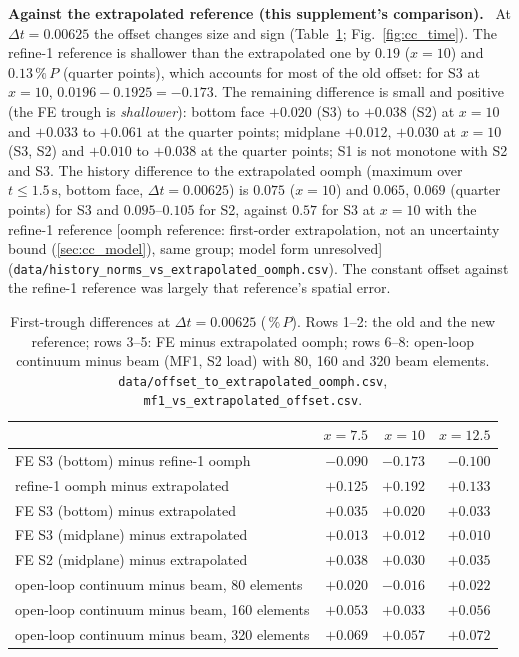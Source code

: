 \documentclass[sn-mathphys,Numbered]{sn-jnl}
\newcommand{\urefFull}{{\small[oomph reference: first-order extrapolation, not an uncertainty bound (\ref{sec:cc_model}), same group; model form unresolved]}}
\newcommand{\pP}{\ensuremath{\,\%\,P}}
\renewcommand{\paragraph}[1]{\par\vspace{0.15\baselineskip}\noindent\textbf{#1}\ }
\begin{document}
\paragraph{Against the extrapolated reference (this supplement's comparison).}
At $\Delta t=0.00625$ the offset changes size and sign (Table~\ref{tab:cc_off}; Fig.~\ref{fig:cc_time}). The refine-1 reference is shallower than the extrapolated one by $0.19$ ($x=10$) and $0.13\,\%\,P$ (quarter points), which accounts for most of the old offset: for S3 at $x=10$, $0.0196-0.1925=-0.173$. The remaining difference is small and positive (the FE trough is \emph{shallower}): bottom face $+0.020$ (S3) to $+0.038$ (S2) at $x=10$ and $+0.033$ to $+0.061$ at the quarter points; midplane $+0.012$, $+0.030$ at $x=10$ (S3, S2) and $+0.010$ to $+0.038$ at the quarter points; S1 is not monotone with S2 and S3. The history difference to the extrapolated oomph (maximum over $t\le1.5\,\mathrm s$, bottom face, $\Delta t=0.00625$) is $0.075$ ($x=10$) and $0.065$, $0.069$ (quarter points) for S3 and $0.095$--$0.105$ for S2, against $0.57$ for S3 at $x=10$ with the refine-1 reference \urefFull{} (\texttt{data/history\_norms\_vs\_extrapolated\_oomph.csv}). The constant offset against the refine-1 reference was largely that reference's spatial error.
\begin{table}[!htb]
\centering
\caption{First-trough differences at $\Delta t=0.00625$ (\pP). Rows 1--2: the old and the new reference; rows 3--5: FE minus extrapolated oomph; rows 6--8: open-loop continuum minus beam (MF1, S2 load) with 80, 160 and 320 beam elements. \texttt{data/offset\_to\_extrapolated\_oomph.csv}, \texttt{mf1\_vs\_extrapolated\_offset.csv}.}\label{tab:cc_off}
\small
\begin{tabular}{@{}lrrr@{}}
\toprule
 & $x=7.5$ & $x=10$ & $x=12.5$ \\
\midrule
FE S3 (bottom) minus refine-1 oomph & $-0.090$ & $-0.173$ & $-0.100$ \\
refine-1 oomph minus extrapolated & $+0.125$ & $+0.192$ & $+0.133$ \\
FE S3 (bottom) minus extrapolated & $+0.035$ & $+0.020$ & $+0.033$ \\
FE S3 (midplane) minus extrapolated & $+0.013$ & $+0.012$ & $+0.010$ \\
FE S2 (midplane) minus extrapolated & $+0.038$ & $+0.030$ & $+0.035$ \\
open-loop continuum minus beam, 80 elements & $+0.020$ & $-0.016$ & $+0.022$ \\
open-loop continuum minus beam, 160 elements & $+0.053$ & $+0.033$ & $+0.056$ \\
open-loop continuum minus beam, 320 elements & $+0.069$ & $+0.057$ & $+0.072$ \\
\bottomrule
\end{tabular}
\end{table}
\end{document}
